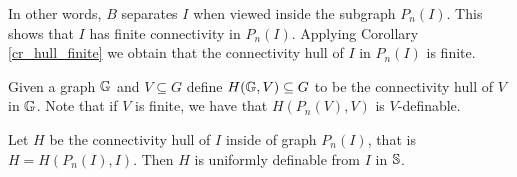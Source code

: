 In other words, $B$ separates $I$ when viewed inside the subgraph $P_n(I)$.
This shows that $I$ has finite connectivity in $P_n(I)$.
Applying Corollary \ref{cr_hull_finite} we obtain that the connectivity hull of $I$ in $P_n(I)$ is finite.


\begin{Definition}
  Given a graph $\mathbb G$ and $V \subseteq G$ define $H(\mathbb G, V) \subseteq G$ to be the connectivity hull of $V$ in $\mathbb G$.
  Note that if $V$ is finite, we have that $H(P_n(V), V)$ is $V$-definable.
\end{Definition}

\begin{Lemma} \label{lm_uniform}
  Let $H$ be the connectivity hull of $I$ inside of graph $P_n(I)$, that is $H = H(P_n(I), I)$.
  Then $H$ is uniformly definable from $I$ in $\mathbb S$.
\end{Lemma}

